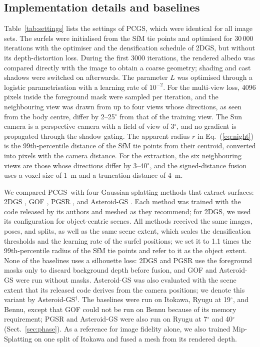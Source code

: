 \documentclass[fleqn,usenatbib]{aa}
\newcommand{\pcgs}{PCGS}
\begin{document}


\subsection{Implementation details and baselines}
\label{sec:implementation}

Table~\ref{tab:settings} lists the settings of \pcgs, which were identical for all image sets. The surfels were
initialised from the SfM tie points and optimised for 30\,000 iterations with the optimiser and the densification
schedule of 2DGS, but without its depth-distortion loss. During the first 3000 iterations, the rendered albedo was
compared directly with the image to obtain a coarse geometry; shading and cast shadows were switched on afterwards.
The parameter $L$ was optimised through a logistic parametrisation with a learning rate of $10^{-2}$. For the
multi-view loss, 4096 pixels inside the foreground mask were sampled per iteration, and the neighbouring view was drawn
from up to four views whose directions, as seen from the body centre, differ by 2--25$^\circ$ from that of the training
view. The Sun camera is a perspective camera with a field of view of 3$^\circ$, and no gradient is propagated through
the shadow gating. The apparent radius $r$ in Eq.~(\ref{eq:night}) is the 99th-percentile distance of the SfM tie
points from their centroid, converted into pixels with the camera distance. For the extraction, the six neighbouring
views are those whose directions differ by 3--40$^\circ$, and the signed-distance fusion uses a voxel size of 1~m and a
truncation distance of 4~m.

We compared \pcgs\ with four Gaussian splatting methods that extract surfaces: 2DGS \citep{Huang2024}, GOF
\citep{Yu2024GOF}, PGSR \citep{Chen2024PGSR}, and Asteroid-GS \citep{Zhang2025AsteroidGS}. Each method was trained with
the code released by its authors and meshed as they recommend; for 2DGS, we used its configuration for object-centric
scenes. All methods received the same images, poses, and splits, as well as the same scene extent, which scales the densification thresholds and the learning rate of the surfel
positions; we set it to 1.1 times the 99th-percentile radius of the SfM tie points and refer to it as the object
extent. None of the baselines uses a silhouette loss: 2DGS and PGSR use the
foreground masks only to discard background depth before fusion, and GOF and Asteroid-GS were run without masks.
Asteroid-GS was also evaluated with the scene extent that its released code derives from the camera positions; we
denote this variant by Asteroid-GS$^\dagger$. The baselines were run on Itokawa, Ryugu at 19$^\circ$, and Bennu, except that GOF could not be run on Bennu because of its memory requirement; PGSR and Asteroid-GS were also run on Ryugu at 7$^\circ$ and
40$^\circ$ (Sect.~\ref{sec:phase}). As a reference for image fidelity alone, we also trained Mip-Splatting
\citep{Yu2024Mip} on one split of Itokawa and fused a mesh from its rendered depth.
\end{document}
